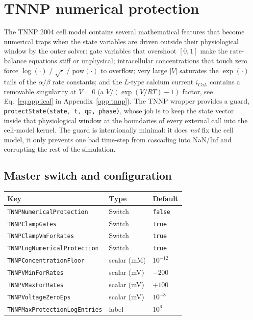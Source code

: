 \documentclass[11pt,a4paper]{article}
\newcommand{\code}[1]{\texttt{\small #1}}
\begin{document}
\section{TNNP numerical protection}
\label{sec:tnnpProtect}

The TNNP 2004 cell model contains several mathematical features that
become numerical traps when the state variables are driven outside
their physiological window by the outer solver: gate variables that
overshoot $[0,1]$ make the rate-balance equations stiff or
unphysical; intracellular concentrations that touch zero force
$\log(\cdot)$ / $\sqrt{\cdot}$ / $\mathrm{pow}(\cdot)$ to overflow;
very large $|V|$ saturates the $\exp(\cdot)$ tails of the
$\alpha/\beta$ rate constants; and the $L$-type calcium current
$i_{CaL}$ contains a removable singularity at $V=0$ (a
$V/(\exp(V/RT)-1)$ factor, see Eq.~\eqref{eq:app:ical} in
Appendix~\ref{app:tnnp}). The TNNP wrapper provides a guard,
\code{protectState(state, t, qp, phase)}, whose job is to keep the
state vector inside that physiological window at the boundaries of
every external call into the cell-model kernel. The guard is
intentionally minimal: it does \emph{not} fix the cell model, it
only prevents one bad time-step from cascading into NaN/Inf and
corrupting the rest of the simulation.

\subsection{Master switch and configuration}
\label{sec:tnnp:knobs}

\begin{center}
\begin{tabular}{@{}lll@{}}
\toprule
Key & Type & Default \\
\midrule
\code{TNNPNumericalProtection} & Switch & \code{false} \\
\code{TNNPClampGates} & Switch & \code{true} \\
\code{TNNPClampVmForRates} & Switch & \code{true} \\
\code{TNNPLogNumericalProtection} & Switch & \code{true} \\
\code{TNNPConcentrationFloor} & scalar (mM) & $10^{-12}$ \\
\code{TNNPVMinForRates} & scalar (mV) & $-200$ \\
\code{TNNPVMaxForRates} & scalar (mV) & $+100$ \\
\code{TNNPVoltageZeroEps} & scalar (mV) & $10^{-8}$ \\
\code{TNNPMaxProtectionLogEntries} & label & $10^{6}$ \\
\bottomrule
\end{tabular}
\end{center}
\end{document}
